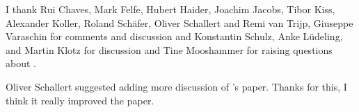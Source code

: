 I thank Rui Chaves, Mark Felfe, Hubert Haider, Joachim Jacobs, Tibor Kiss, Alexander Koller, Roland
Schäfer, Oliver Schallert and Remi van Trijp, Giuseppe
Varaschin for comments and discussion and Konstantin Schulz, Anke Lüdeling, and Martin Klotz for 
discussion and Tine Mooshammer for raising questions about .

Oliver Schallert suggested adding more discussion of \citeauthor{Piantadosi2024a}'s paper. Thanks
for this, I think it really improved the paper.



